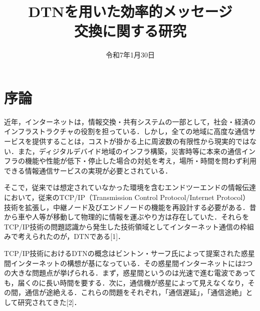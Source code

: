\documentclass[11pt]{icsthesis}
\title{DTNを用いた効率的メッセージ\\交換に関する研究}
\date{令和7年1月30日}
\begin{document}
\maketitle
\pagestyle{fancy}
\fancyhead[R]{\nouppercase{\fontsize{10.5pt}{0pt}\selectfont\rightmark}}
\fancyhead[L]{\nouppercase{\fontsize{10.5pt}{0pt}\selectfont\leftmark}}
\fancyfoot[C]{--\ \thepage\ --}
\renewcommand{\headrulewidth}{0.3truemm}
\setcounter{tocdepth}{4}
\pagestyle{fancy}
\fancyfoot[C]{--\ \thepage\ --}
{\makeatletter
\let\ps@jpl@in\ps@empty
\makeatother
\pagestyle{plain}
\tableofcontents
\clearpage}

\chapter{序論}
近年，インターネットは，情報交換・共有システムの一部として，社会・経済のインフラストラクチャの役割を担っている．しかし，全ての地域に高度な通信サービスを提供することは，コストが掛かる上に周波数の有限性から現実的ではない．また，ディジタルデバイド地域のインフラ構築，災害時等に本来の通信インフラの機能や性能が低下・停止した場合の対処を考え，場所・時間を問わず利用できる情報通信サービスの実現が必要とされている．

そこで，従来では想定されていなかった環境を含むエンドツーエンドの情報伝達において，従来のTCP/IP（Transmission Control Protocol/Internet Protocol）技術を拡張し，中継ノード及びエンドノードの機能を再設計する必要がある．昔から車や人等が移動して物理的に情報を運ぶやり方は存在していた．それらをTCP/IP技術の問題認識から発生した技術領域としてインターネット通信の枠組みで考えられたのが，DTNである[1]．

TCP/IP技術におけるDTNの概念はビントン・サーフ氏によって提案された惑星間インターネットの構想が基になっている．その惑星間インターネットには2つの大きな問題点が挙げられる．まず，惑星間というのは光速で進む電波であっても，届くのに長い時間を要する．次に，通信機が惑星によって見えなくなり，その間，通信が途絶える．これらの問題をそれぞれ，「通信遅延」，「通信途絶」として研究されてきた[2]．
\end{document}
